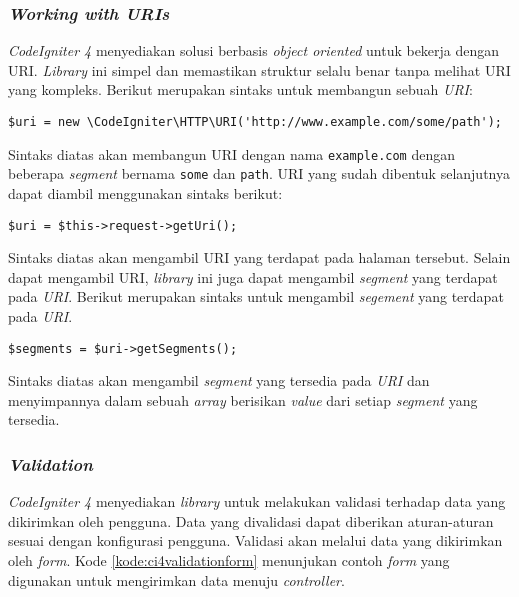 \subsubsection{\textit{Working with URIs}}
\textit{CodeIgniter 4} menyediakan solusi berbasis \textit{object oriented} untuk bekerja dengan URI. \textit{Library} ini simpel dan memastikan struktur selalu benar tanpa melihat URI yang kompleks. Berikut merupakan sintaks untuk membangun sebuah \textit{URI}:
\begin{center}
	\verb|$uri = new \CodeIgniter\HTTP\URI('http://www.example.com/some/path');|
\end{center}
Sintaks diatas akan membangun URI dengan nama \texttt{example.com} dengan beberapa \textit{segment} bernama \texttt{some} dan \texttt{path}. URI yang sudah dibentuk selanjutnya dapat diambil menggunakan sintaks berikut:
\begin{center}
	\verb|$uri = $this->request->getUri();|
\end{center}
Sintaks diatas akan mengambil URI yang terdapat pada halaman tersebut. Selain dapat mengambil URI, \textit{library} ini juga dapat mengambil \textit{segment} yang terdapat pada \textit{URI}. Berikut merupakan sintaks untuk mengambil \textit{segement} yang terdapat pada \textit{URI}.
\begin{center}
	\verb|$segments = $uri->getSegments();|
\end{center}
Sintaks diatas akan mengambil \textit{segment} yang tersedia pada \textit{URI} dan menyimpannya dalam sebuah \textit{array} berisikan \textit{value} dari setiap \textit{segment} yang tersedia.

\subsubsection{\textit{Validation}}
\textit{CodeIgniter 4} menyediakan \textit{library} untuk melakukan validasi terhadap data yang dikirimkan oleh pengguna. Data yang divalidasi dapat diberikan aturan-aturan sesuai dengan konfigurasi pengguna. Validasi akan melalui data yang dikirimkan oleh \textit{form}. Kode \ref{kode:ci4validationform} menunjukan contoh \textit{form} yang digunakan untuk mengirimkan data menuju \textit{controller}.

